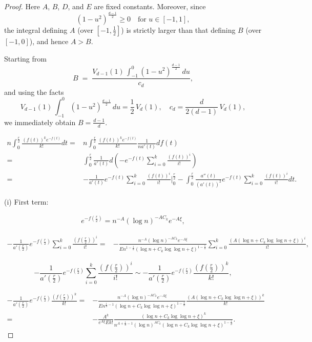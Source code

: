 \documentclass[10pt,a4paper]{amsart}
\begin{document}
\begin{proof}
	Here \(A\), \(B\), \(D\), and \(E\) are fixed constants.  Moreover, since
	$$
	(1 - u^2)^{\frac{d-1}{2}}\ge0
	\quad\text{for }u\in[-1,1],
	$$
	the integral defining \(A\) (over \([-1,\tfrac12]\)) is strictly larger than that defining \(B\) (over \([-1,0]\)), and hence $A>B$.
	
	
	Starting from
	$$
	B \;=\;\frac{V_{d-1}(1)\,\displaystyle\int_{-1}^{0}(1 - u^2)^{\frac{d-1}{2}}\,du}{c_d},
	$$
	and using the facts
	$$
	V_{d-1}(1)\,\int_{-1}^{0}(1 - u^2)^{\frac{d-1}{2}}\,du
	=\frac{1}{2}\,V_d(1),
	\quad
	c_d=\frac{d}{2(d-1)}\,V_d(1),
	$$
	we immediately obtain $B = \frac{d-1}{d}$.
	
	\begin{equation*}
		\begin{aligned}
			n\int_{0}^{\frac r2} \frac{(f(t))^ke^{-f(t)}}{k!}dt=&n\int_{0}^{\frac r2} \frac{(f(t))^ke^{-f(t)}}{k!} \frac{1}{na'(t)} df(t)\\
			=&   \int_{0}^{\frac r2} \frac{1}{a'(t)}d\left(-e^{-f(t)} \sum_{i=0}^{k}\frac{(f(t))^i}{i!}  \right)\\
			=&-\frac{1}{a'(t)}e^{-f(t)}\sum_{i=0}^{k}\frac{(f(t))^i}{i!}|_{0}^{\frac r2}
			-\int_{0}^{\frac r2} \frac{a''(t)}{(a'(t))^2}e^{-f(t)}\sum_{i=0}^{k}\frac{(f(t))^i}{i!}dt.
		\end{aligned}
	\end{equation*}
	
	(i) First term:
	
	
	\begin{equation*}
		\begin{aligned}
			e^{-f(\frac{r}{2})} = n^{-A} (\log n)^{-AC_k}e^{-A\xi},
		\end{aligned}
	\end{equation*}
	
	\begin{equation*}
		\begin{aligned}
			-\frac{1}{a'(\frac{r}{2})}e^{-f(\frac{r}{2})}\sum_{i=0}^{k}\frac{(f(\frac{r}{2}))^i}{i!} =& -\frac{n^{-A} (\log n)^{-AC_k}e^{-A\xi}}{E n^{1-\frac{1}{d}}\left(\log n+ C_k \log\log n+\xi\right)^{1-\frac{1}{d}}} \sum_{i=0}^k\frac{(A\left( \log n+ C_k \log\log n+\xi\right))^i}{i!},
		\end{aligned}
	\end{equation*}
	
	$$
	-\frac{1}{a'(\frac{r}{2})}e^{-f(\frac{r}{2})}\sum_{i=0}^{k}\frac{(f(\frac{r}{2}))^i}{i!} \sim -\frac{1}{a'(\frac{r}{2})}e^{-f(\frac{r}{2})}\frac{(f(\frac{r}{2}))^k}{k!},
	$$
	
	\begin{equation*}
		\begin{aligned}
			-\frac{1}{a'(\frac{r}{2})}e^{-f(\frac{r}{2})}\frac{(f(\frac{r}{2}))^k}{k!} =& -\frac{n^{-A} (\log n)^{-AC_k}e^{-A\xi}}{E n^{\frac{1}{d}-1}\left(\log n+ C_k \log\log n+\xi\right)^{1-\frac{1}{d}}}\frac{(A\left( \log n+ C_k \log\log n+\xi\right))^k}{k!} \\
			=& -\frac{A^k}{e^{A\xi}Ek!} \frac{\left( \log n+ C_k \log\log n+\xi\right)^k}{n^{A+\frac{1}{d}-1}(\log n)^{AC_k}\left(\log n+ C_k \log\log n+\xi\right)^{1-\frac{1}{d}}}.
		\end{aligned}
	\end{equation*}
	

\end{proof}
\end{document}
